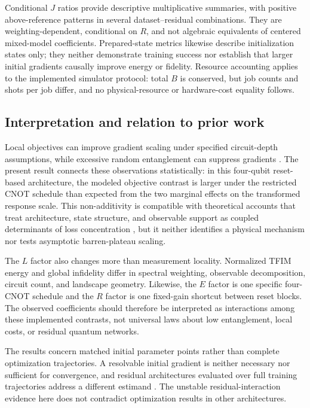 \documentclass[pdflatex,sn-basic,Numbered]{sn-jnl}
\begin{document}
Conditional $J$ ratios provide descriptive multiplicative summaries, with positive above-reference patterns in several dataset--residual combinations. They are weighting-dependent, conditional on $R$, and not algebraic equivalents of centered mixed-model coefficients. Prepared-state metrics likewise describe initialization states only; they neither demonstrate training success nor establish that larger initial gradients causally improve energy or fidelity. Resource accounting applies to the implemented simulator protocol: total $B$ is conserved, but job counts and shots per job differ, and no physical-resource or hardware-cost equality follows.

\subsection{Interpretation and relation to prior work}

Local objectives can improve gradient scaling under specified circuit-depth assumptions, while excessive random entanglement can suppress gradients \cite{cerezo2021costfunction,ortizmarrero2021entanglement,patti2021entanglement}. The present result connects these observations statistically: in this four-qubit reset-based architecture, the modeled objective contrast is larger under the restricted CNOT schedule than expected from the two marginal effects on the transformed response scale. This non-additivity is compatible with theoretical accounts that treat architecture, state structure, and observable support as coupled determinants of loss concentration \cite{ragone2024lie}, but it neither identifies a physical mechanism nor tests asymptotic barren-plateau scaling.

The $L$ factor also changes more than measurement locality. Normalized TFIM energy and global infidelity differ in spectral weighting, observable decomposition, circuit count, and landscape geometry. Likewise, the $E$ factor is one specific four-CNOT schedule and the $R$ factor is one fixed-gain shortcut between reset blocks. The observed coefficients should therefore be interpreted as interactions among these implemented contrasts, not universal laws about low entanglement, local costs, or residual quantum networks.

The results concern matched initial parameter points rather than complete optimization trajectories. A resolvable initial gradient is neither necessary nor sufficient for convergence, and residual architectures evaluated over full training trajectories address a different estimand \cite{anschuetz2022traps,grant2019identity,skolik2021layerwise,kashif2024resqnets}. The unstable residual-interaction evidence here does not contradict optimization results in other architectures.
\end{document}
